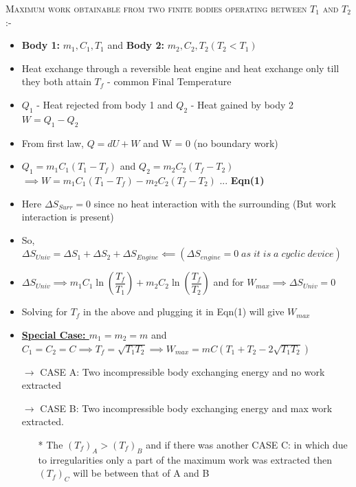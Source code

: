 \documentclass[8pt]{article}
\begin{document}
\textsc{Maximum work obtainable from two finite bodies operating between $T_1$ and $T_2$ :-}
	\begin{itemize}
		\item \textbf{Body 1:} $m_1, C_1, T_1$ and \textbf{Body 2:} $m_2, C_2, T_2 (T_2 < T_1)$
		\item Heat exchange through a reversible heat engine and heat exchange only till they both attain $T_f$ - common Final Temperature
		\item $Q_1$ - Heat rejected from body 1 and $Q_2$ - Heat gained by body 2 $\boxed{W = Q_1 - Q_2}$
		\item From first law, $Q = dU + W$ and W = 0 (no boundary work)
		\item $Q_1 = m_1C_1(T_1-T_f)$ and $Q_2 = m_2C_2(T_f-T_2)$ $\implies W = m_1C_1(T_1-T_f) -  m_2C_2(T_f-T_2)$ ... \textbf{Eqn(1)}
		\item Here $\Delta S_{Surr} = 0$ since no heat interaction with the surrounding (But work interaction is present)
		\item So, $\Delta S_{Univ} = \Delta S_1 + \Delta S_2 + \Delta S_{Engine} \impliedby (\Delta S_{engine} = 0\;as\;it\;is\;a\;cyclic\;device)$
		\item $\Delta S_{Univ} \implies \boxed{m_1C_1\ln\left(\dfrac{T_f}{T_1}\right) + m_2C_2\ln\left(\dfrac{T_f}{T_2}\right)}$ and for $W_{max} \implies \Delta S_{Univ} = 0$
		\item Solving for $T_f$ in the above and plugging it in Eqn(1) will give $W_{max}$
		\item \textbf{\underline{Special Case: }} $\boxed{m_1 = m_2 = m}$ and $\boxed{C_1 = C_2 = C} \implies \boxed{T_f = \sqrt{T_1T_2}} \implies \boxed{W_{max} = mC\left(T_1+T_2-2\sqrt{T_1T_2}\right)}$
		\item[$\rightarrow$] CASE A: Two incompressible body exchanging energy and no work extracted
		\item[$\rightarrow$] CASE B: Two incompressible body exchanging energy and max work extracted.
		\begin{itemize}
			\item[*] The $(T_f)_A > (T_f)_B$ and if there was another CASE C: in which due to irregularities only a part of the maximum work was extracted then $(T_f)_C$ will be between that of A and B
		\end{itemize}
	\end{itemize}\hrulefill\\\\
\end{document}
